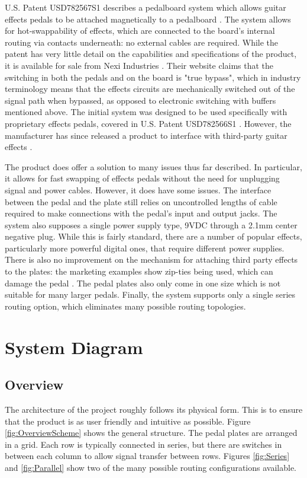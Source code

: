 \documentclass{article}
\begin{document}
		U.S. Patent USD782567S1 describes a pedalboard system which allows guitar effects pedals to be attached magnetically to a pedalboard \cite{FAORO:2015board}.  The system allows for hot-swappability of effects, which are connected to the board's internal routing via contacts underneath: no external cables are required.  While the patent has very little detail on the capabilities and specifications of the product, it is available for sale from Nexi Industries \cite{NexiIndustries}.  Their website claims that the switching in both the pedals and on the board is "true bypass", which in industry terminology means that the effects circuits are mechanically switched out of the signal path when bypassed, as opposed to electronic switching with buffers mentioned above.  The initial system was designed to be used specifically with proprietary effects pedals, covered in U.S. Patent USD782566S1 \cite{FAORO:2015pedal}.  However, the manufacturer has since released a product to interface with third-party guitar effects \cite{conNEXI}.

		The product does offer a solution to many issues thus far described.  In particular, it allows for fast swapping of effects pedals without the need for unplugging signal and power cables.  However, it does have some issues.  The interface between the pedal and the plate still relies on uncontrolled lengths of cable required to make connections with the pedal's input and output jacks.  The system also supposes a single power supply type, 9VDC through a 2.1mm center negative plug.  While this is fairly standard, there are a number of popular effects, particularly more powerful digital ones, that require different power supplies.  There is also no improvement on the mechanism for attaching third party effects to the plates: the marketing examples show zip-ties being used, which can damage the pedal \cite{conNEXI}.  The pedal plates also only come in one size which is not suitable for many larger pedals.  Finally, the system supports only a single series routing option, which eliminates many possible routing topologies.

\section{System Diagram}
	\subsection{Overview}
	The architecture of the project roughly follows its physical form.  This is to ensure that the product is as user friendly and intuitive as possible.  Figure \ref{fig:OverviewScheme} shows the general structure.  The pedal plates are arranged in a grid.  Each row is typically connected in series, but there are switches in between each column to allow signal transfer between rows.  Figures \ref{fig:Series} and \ref{fig:Parallel} show two of the many possible routing configurations available.
\end{document}
